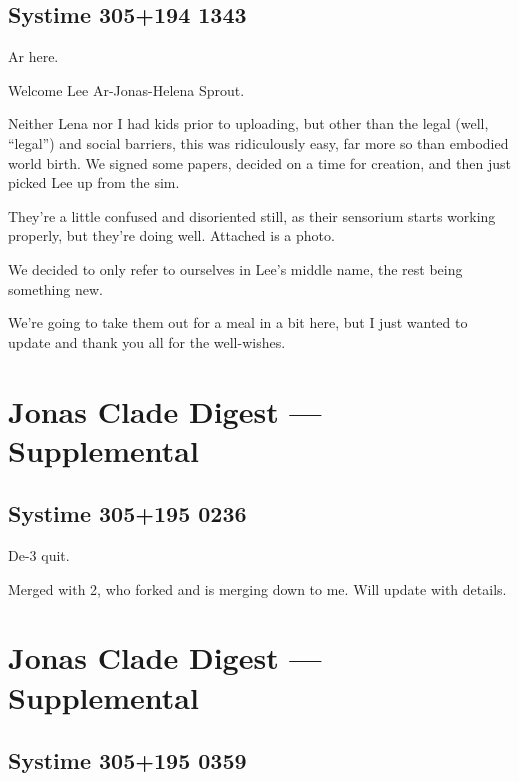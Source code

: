 \hypertarget{systime-305194-1343}{%
\subsection*{Systime 305+194 1343}\label{systime-305194-1343}}

Ar here.

Welcome Lee Ar-Jonas-Helena Sprout.

Neither Lena nor I had kids prior to uploading, but other than the legal (well, ``legal'') and social barriers, this was ridiculously easy, far more so than embodied world birth. We signed some papers, decided on a time for creation, and then just picked Lee up from the sim.

They're a little confused and disoriented still, as their sensorium starts working properly, but they're doing well. Attached is a photo.

We decided to only refer to ourselves in Lee's middle name, the rest being something new.

We're going to take them out for a meal in a bit here, but I just wanted to update and thank you all for the well-wishes.

\newpage
\hypertarget{jonas-clade-digest-supplemental-2}{%
\section*{Jonas Clade Digest --- Supplemental}\label{jonas-clade-digest-supplemental-2}}

\hypertarget{systime-305195-0236}{%
\subsection*{Systime 305+195 0236}\label{systime-305195-0236}}

De-3 quit.

Merged with 2, who forked and is merging down to me. Will update with details.

\newpage
\hypertarget{jonas-clade-digest-supplemental-3}{%
\section*{Jonas Clade Digest --- Supplemental}\label{jonas-clade-digest-supplemental-3}}

\hypertarget{systime-305195-0359}{%
\subsection*{Systime 305+195 0359}\label{systime-305195-0359}}

